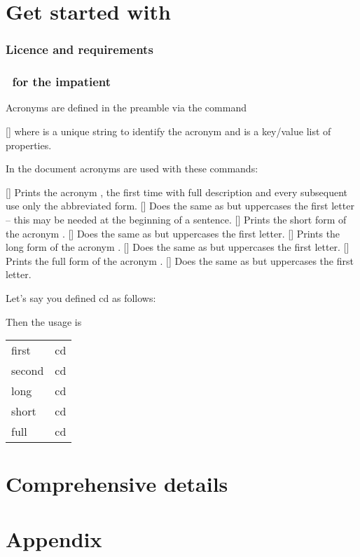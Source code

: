 \documentclass{acro-manual}
\begin{document}
\part{Get started with \acro}

\section{Licence and requirements}
\license

\section{\acro\ for the impatient}

Acronyms are defined in the preamble via the command
\begin{commands}
  []
    where  is a unique string to identify the acronym and
     is a key\slash value list of properties.
\end{commands}
In the document acronyms are used with these commands:
\begin{commands}
  []
    Prints the acronym , the first time with full description and
    every subsequent use only the abbreviated form.
  []
    Does the same as  but uppercases the first letter -- this may be
    needed at the beginning of a sentence.
  []
    Prints the short form of the acronym .
  []
    Does the same as  but uppercases the first letter.
  []
    Prints the long form of the acronym .
  []
    Does the same as  but uppercases the first letter.
  []
    Prints the full form of the acronym .
  []
    Does the same as  but uppercases the first letter.
\end{commands}
Let's say you defined \acs*{cd} as follows:
\begin{sourcecode}
\end{sourcecode}
Then the usage is
\begin{example}
  \begin{tabular}{ll}
    first  & \ac{cd} \\
    second & \ac{cd} \\
    long   & \acl{cd} \\
    short  & \acs{cd} \\
    full   & \acf{cd}
  \end{tabular}
\end{example}

\part{Comprehensive details}

\appendix
\part{Appendix}

\printacronyms[
  preamble = {Below all abbreviations are listed which have been defined for
    the manual.} ,
  exclude = exclude
]


\end{document}
